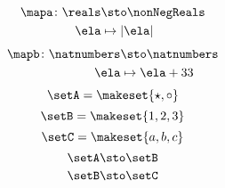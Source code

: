 \begin{forslides}
    \begin{equation}
        \label{eq:quiz_inj_1}
        \begin{aligned}
            \mapa\colon \reals & \sto \nonNegReals \\
            \ela               & \mapsto \vert \ela \vert
        \end{aligned}
    \end{equation}
    \begin{equation}
        \label{eq:quiz_inj_2}
        \begin{aligned}
            \mapb\colon \natnumbers & \sto \natnumbers \\
            \ela                    & \mapsto \ela + 33
        \end{aligned}
    \end{equation}
    \begin{equation}
        \label{eq:quiz_isos_1}
        \setA=\makeset{\star, \circ}
    \end{equation}
    \begin{equation}
        \label{eq:quiz_isos_2}
        \setB=\makeset{1, 2, 3}
    \end{equation}
    \begin{equation}
        \label{eq:quiz_isos_3}
        \setC=\makeset{a, b, c}
    \end{equation}
    \begin{equation}
        \label{eq:quiz_isos_4}
        \setA \sto \setB
    \end{equation}
    \begin{equation}
        \label{eq:quiz_isos_5}
        \setB \sto \setC
    \end{equation}
\end{forslides}

